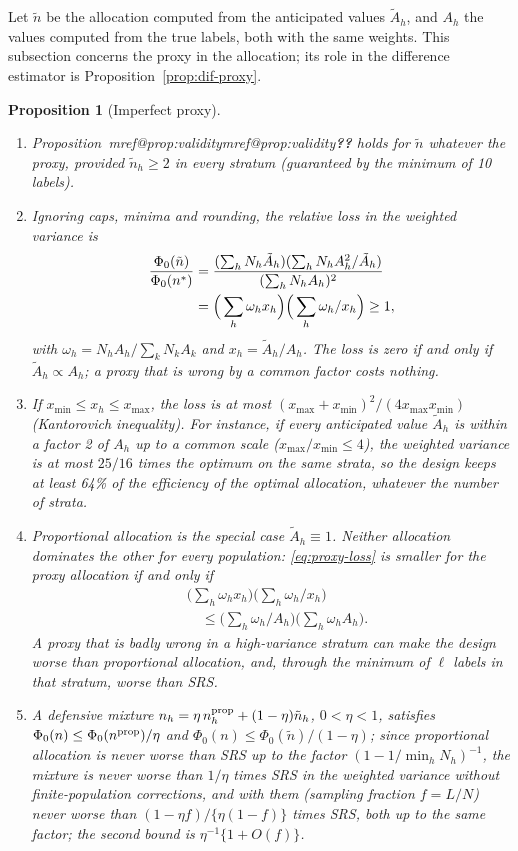 \documentclass[pdflatex,sn-mathphys-num,iicol]{sn-jnl}
\makeatletter
\theoremstyle{thmstyleone}
\newtheorem{proposition}{Proposition}
\theoremstyle{thmstyletwo}
\theoremstyle{thmstylethree}
\newcommand{\Mref}[1]{\ifcsname mref@#1\endcsname\csname mref@#1\endcsname\else\textbf{??}\fi}
\makeatother
\begin{document}
Let $\tilde n$ be the allocation computed from the anticipated values $\tilde A_h$, and $A_h$ the
values computed from the true labels, both with the same weights. This subsection concerns the proxy in the allocation; its role in the
difference estimator is Proposition~\ref{prop:dif-proxy}.

\begin{proposition}[Imperfect proxy]\label{prop:proxy}
\begin{enumerate}
\item[(a)] Proposition~\Mref{prop:validity} holds for $\tilde n$ whatever the proxy, provided
$\tilde n_h\ge2$ in every stratum (guaranteed by the minimum of 10 labels).
\item[(b)] Ignoring caps, minima and rounding, the relative loss in the weighted variance is
\begin{align}
\frac{\Phi_0(\tilde n)}{\Phi_0(n^\ast)}&=
\frac{(\sum_hN_h\tilde A_h)(\sum_hN_hA_h^2/\tilde A_h)}{(\sum_hN_hA_h)^2}\notag\\
&=\Big(\sum_h\omega_hx_h\Big)\Big(\sum_h\omega_h/x_h\Big)\ge1,\label{eq:proxy-loss}
\end{align}
with $\omega_h=N_hA_h/\sum_kN_kA_k$ and $x_h=\tilde A_h/A_h$. The loss is zero if and only if
$\tilde A_h\propto A_h$; a proxy that is wrong by a common factor costs nothing.
\item[(c)] If $x_{\min}\le x_h\le x_{\max}$, the loss is at most
$(x_{\max}+x_{\min})^2/(4x_{\max}x_{\min})$ (Kantorovich inequality). For instance, if every
anticipated value $\tilde A_h$ is within a factor 2 of $A_h$ up to a common scale
($x_{\max}/x_{\min}\le4$), the weighted variance is at most $25/16$ times the optimum on the same
strata, so the design keeps at least 64\% of the efficiency of the optimal allocation, whatever
the number of strata.
\item[(d)] Proportional allocation is the special case $\tilde A_h\equiv1$. Neither allocation
dominates the other for every population: \eqref{eq:proxy-loss} is smaller for the proxy
allocation if and only if
\begin{align*}
&\Big(\sum_h\omega_hx_h\Big)\Big(\sum_h\omega_h/x_h\Big)\\
&\quad\le\Big(\sum_h\omega_h/A_h\Big)\Big(\sum_h\omega_hA_h\Big).
\end{align*}
A proxy that is badly wrong in a high-variance stratum can make the design worse than
proportional allocation, and, through the minimum of $\ell$ labels in that stratum, worse than SRS.
\item[(e)] A defensive mixture $n_h=\eta\,n^{\rm prop}_h+(1-\eta)\tilde n_h$, $0<\eta<1$, satisfies
$\Phi_0(n)\le\Phi_0(n^{\rm prop})/\eta$ and $\Phi_0(n)\le\Phi_0(\tilde n)/(1-\eta)$; since
proportional allocation is never worse than SRS up to the factor $(1-1/\min_hN_h)^{-1}$, the
mixture is never worse than $1/\eta$ times SRS in the weighted variance without finite-population corrections, and with them (sampling fraction $f=L/N$) never worse than $(1-\eta f)/\{\eta(1-f)\}$ times SRS,
both up to the same factor; the second bound is $\eta^{-1}\{1+O(f)\}$.
\end{enumerate}
\end{proposition}
\end{document}

